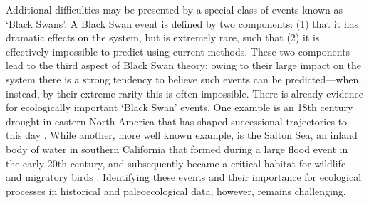 \documentclass[11pt,a4paper,oneside]{article}
\begin{document}
Additional difficulties may be presented by a special class of events known as `Black Swans'. A Black Swan event is defined by two components: (1) that it has dramatic effects on the system, but is extremely rare, such that (2) it is effectively impossible to predict using current methods. These two components lead to the third aspect of Black Swan theory: owing to their large impact on the system there is a strong tendency to believe such events can be predicted---when, instead, by their extreme rarity this is often impossible.  There is already evidence for ecologically important `Black Swan' events. One example is an 18th century drought in eastern North America that has shaped successional trajectories to this day \citep{Pederson2014}. While another, more well known example, is the Salton Sea, an inland body of water in southern California that formed during a large flood event in the early 20th century, and subsequently became a critical habitat for wildlife and migratory birds \citep{Cohn2000}. Identifying these events and their importance for ecological processes in historical and paleoecological data, however, remains challenging.\\ 
\end{document}
